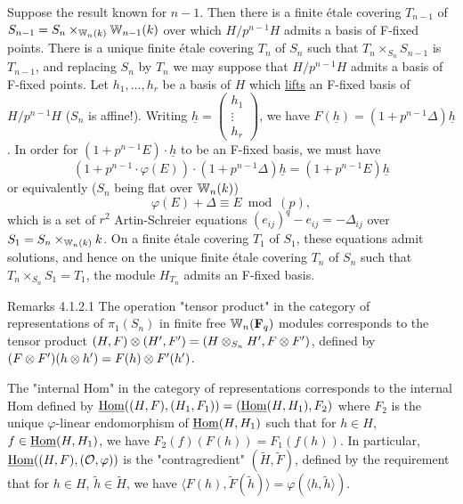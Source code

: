 \begin{kaproof}
Suppose the result known for $n-1$. Then there is a finite \'etale covering
$T_{n-1}$ of $S_{n-1}=S_n\times_{\mathbb{W}_n(k)}\mathbb{W}_{n-1}(k)$ over which $H/p^{n-1}H$
admits a basis of F-fixed points. There is a unique finite \'etale covering
$T_n$ of $S_n$ such that $T_n\times_{S_n}S_{n-1}$ is $T_{n-1}$, and replacing
$S_n$ by $T_n$ we may suppose that $H/p^{n-1}H$ admits a basis of F-fixed
points. Let $h_1,\dots,h_r$ be a basis of $H$ which \uline{lifts} an F-fixed
basis of $H/p^{n-1}H$ ($S_n$ is affine!). Writing
$\underline{h}=\begin{pmatrix}h_1\\ \vdots\\ h_r\end{pmatrix}$, we have
$F(\underline{h})=(1+p^{n-1}\Delta)\underline{h}$. In order for
$(1+p^{n-1}E)\cdot\underline{h}$ to be an F-fixed basis, we must have
\[
(1+p^{n-1}\cdot\varphi(E))\cdot(1+p^{n-1}\Delta)\underline{h} = (1+p^{n-1}E)\underline{h}
\]
or equivalently ($S_n$ being flat over $\mathbb{W}_n(k)$)
\[
\varphi(E)+\Delta\equiv E \bmod (p),
\]
which is a set of $r^2$ Artin-Schreier equations $(e_{ij})^q-e_{ij}=-\Delta_{ij}$
over $S_1=S_n\times_{\mathbb{W}_n(k)}k$. On a finite \'etale covering $T_1$ of $S_1$,
these equations admit solutions, and hence on the unique finite \'etale covering
$T_n$ of $S_n$ such that $T_n\times_{S_n}S_1=T_1$, the module $H_{T_n}$ admits
an F-fixed basis.
\end{kaproof}

\begin{kathmstar}[4.1.2.1]{Remarks 4.1.2.1}
The operation "tensor product" in the category of representations of
$\pi_1(S_n)$ in finite free $\mathbb{W}_n(\mathbf{F}_q)$ modules corresponds to the tensor
product $(H,F)\otimes(H',F')=(H\otimes_{S_n}H',F\otimes F')$, defined by
$(F\otimes F')(h\otimes h')=F(h)\otimes F'(h')$.
\end{kathmstar}

 The "internal Hom" in the category of representations
corresponds to the internal Hom defined by
$\underline{\operatorname{Hom}}((H,F),(H_1,F_1))=(\underline{\operatorname{Hom}}(H,H_1),F_2)$ where $F_2$ is
the unique $\varphi$-linear endomorphism of $\underline{\operatorname{Hom}}(H,H_1)$ such that
for $h\in H$, $f\in\underline{\operatorname{Hom}}(H,H_1)$, we have $F_2(f)(F(h))=F_1(f(h))$.
In particular, $\underline{\operatorname{Hom}}((H,F),(\mathcal{O},\varphi))$ is the "contragredient"
$(\widetilde{H},\widetilde{F})$, defined by the requirement that for $h\in H$,
$\widetilde{h}\in\widetilde{H}$, we have
$\langle F(h),\widetilde{F}(\widetilde{h})\rangle=\varphi(\langle h,\widetilde{h}\rangle)$.

